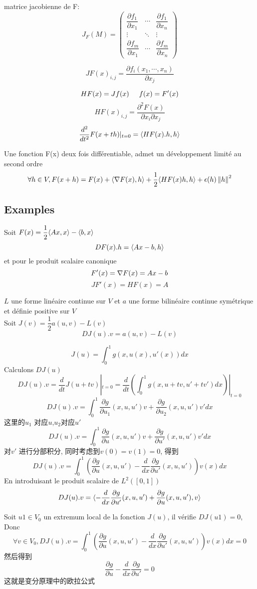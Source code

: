 \documentclass[openany]{book}
\begin{document}
matrice jacobienne de F:
$$
J_F\left(M\right)=
\begin{pmatrix} 
\dfrac{\partial f_1}{\partial x_1} & \cdots & \dfrac{\partial f_1}{\partial x_n} \\
\vdots & \ddots & \vdots \\
\dfrac{\partial f_m}{\partial x_1} & \cdots & \dfrac{\partial f_m}{\partial x_n}
\end{pmatrix}
$$

$$
JF(x)_{i,j} = \frac{\partial  f_i(x_1, \cdots, x_n)}{\partial x_j}
$$

$$
HF(x) = Jf(x) \hspace{0.5cm} f(x) = F'(x)
$$
$$
HF(x)_{i,j} = \frac{\partial ^2 F(x)}{\partial x_i \partial  x_j}
$$
$$
\frac{d^2}{d t^2}F(x+th)|_{t=0} = \langle HF(x).h , h\rangle
$$

\begin{proposition}
Une fonction F(x) deux fois diff\'erentiable, admet un d\'eveloppement limit\'e au second ordre
$$ \forall h \in V, F(x+h) = F(x) + \langle \nabla F(x) , h\rangle + \frac{1}{2}\langle HF(x)h , h\rangle + \epsilon(h)\left\Vert h\right\Vert^2 $$
\end{proposition}

\subsection{Examples}
\begin{example}
Soit $F(x) = \dfrac{1}{2}\langle Ax , x\rangle - \langle b , x\rangle$
$$DF(x).h = \langle Ax-b , h\rangle$$
et pour le produit scalaire canonique
$$
F'(x) = \nabla F(x) = Ax - b
$$
$$JF'(x) = HF(x) = A$$
\end{example}

\begin{example}
$L$ une forme lin\'eaire continue sur $V$  et $a$  une forme bilin\'eaire continue sym\'etrique et d\'efinie positive sur $V$ \\
Soit $J(v) = \dfrac{1}{2}a(u,v) - L(v)$
$$
DJ(u).v = a(u,v) - L(v)
$$
\end{example}

\begin{example}
$$J(u) = \int_0^1 g(x,u(x),u'(x))dx$$
Calculons $DJ(u)$
$$
DJ(u).v 
= \frac{d}{dt}J(u+tv)|_{t=0}
=\frac{d}{dt}(\int_0^1 g(x,u+tv,u'+tv')dx)|_{t=0}
$$
$$
DJ(u).v 
=\int_0^1 \frac{\partial g}{\partial u_1}(x,u,u')v + \frac{\partial g}{\partial u_2}(x,u,u')v' dx
$$
这里的$u_1$ 对应$u$,$u_2$对应$u'$
$$
DJ(u).v 
=\int_0^1 \frac{\partial g}{\partial u}(x,u,u')v + \frac{\partial g}{\partial u'}(x,u,u')v' dx
$$
对$v'$ 进行分部积分, 同时考虑到$v(0)=v(1)=0$, 得到
$$
DJ(u).v 
=\int_0^1 (\frac{\partial g}{\partial u}(x,u,u') - \frac{d}{dx}\frac{\partial g}{\partial u'}(x,u,u'))v(x) dx
$$
En introduisant le produit scalaire de $L^2([0,1])$
$$
DJ(u).v 
= \langle -\frac{d}{dx}\frac{\partial g}{\partial u'}(x,u,u')+\frac{\partial g}{\partial u}(x,u,u') , v\rangle
$$

Soit $u1 \in V_0$ un extremum local de la fonction $J(u)$, il v\'erifie $DJ(u1) = 0$, Donc
$$
\forall v \in V_0, DJ(u).v = \int_0^1 (\frac{\partial  g}{\partial u}(x,u,u') - \frac{d}{dx}\frac{\partial g}{\partial u'}(x,u,u'))v(x) dx = 0
$$
然后得到
$$
\frac{\partial g}{\partial u} - \frac{d}{dx}\frac{\partial g}{\partial u'} = 0
$$
这就是变分原理中的欧拉公式
\end{example}
\end{document}
